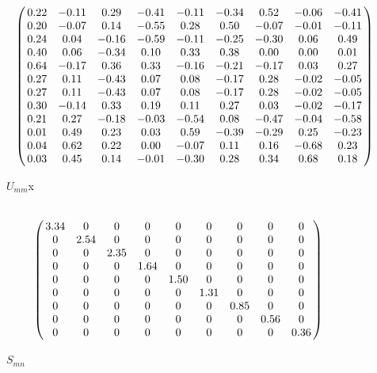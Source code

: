 \begin{figure}[h!]
	\begin{equation} \nonumber
	\bordermatrix{ ~ \cr
		& 0.22 & -0.11 & 0.29 & -0.41 & -0.11 & -0.34 & 0.52 & -0.06 & -0.41 \cr
		& 0.20 & -0.07 & 0.14 & -0.55 & 0.28 & 0.50 & -0.07 & -0.01 & -0.11 \cr
		& 0.24 & 0.04 & -0.16 & -0.59 & -0.11 & -0.25 & -0.30 & 0.06 & 0.49 \cr
		& 0.40 & 0.06 & -0.34 & 0.10 & 0.33 & 0.38 & 0.00 & 0.00 & 0.01 \cr
		& 0.64 & -0.17 & 0.36 & 0.33 & -0.16 & -0.21 & -0.17 & 0.03 & 0.27 \cr
		& 0.27 & 0.11 & -0.43 & 0.07 & 0.08 & -0.17 & 0.28 & -0.02 & -0.05 \cr
		& 0.27 & 0.11 & -0.43 & 0.07 & 0.08 & -0.17 & 0.28 & -0.02 & -0.05 \cr
		& 0.30 & -0.14 & 0.33 & 0.19 & 0.11 & 0.27 & 0.03 & -0.02 & -0.17 \cr
		& 0.21 & 0.27 & -0.18 & -0.03 & -0.54 & 0.08 & -0.47 & -0.04 & -0.58 \cr
		& 0.01 & 0.49 & 0.23 & 0.03 & 0.59 & -0.39 & -0.29 & 0.25 & -0.23 \cr
		& 0.04 & 0.62 & 0.22 & 0.00 & -0.07 & 0.11 & 0.16 & -0.68 & 0.23 \cr
		& 0.03 & 0.45 & 0.14 & -0.01 & -0.30 & 0.28 & 0.34 & 0.68 & 0.18 \cr	  }
	\end{equation}
	\caption{$U_{mm}$x}
	\label{fig:TDM}
\end{figure}

\begin{figure}[h!]
	\begin{equation} \nonumber
	\bordermatrix{~  \cr	
		& 3.34 & 0 & 0 & 0 & 0 & 0 & 0 & 0 & 0 \cr
		& 0 & 2.54 & 0 & 0 & 0 & 0 & 0 & 0 & 0 \cr
		& 0 & 0 & 2.35 & 0 & 0 & 0 & 0 & 0 & 0 \cr
		& 0 & 0 & 0 & 1.64 & 0 & 0 & 0 & 0 & 0 \cr
		& 0 & 0 & 0 & 0 & 1.50 & 0 & 0 & 0 & 0 \cr
		& 0 & 0 & 0 & 0 & 0 & 1.31 & 0 & 0 & 0 \cr
		& 0 & 0 & 0 & 0 & 0 & 0 & 0.85 & 0 & 0 \cr
		& 0 & 0 & 0 & 0 & 0 & 0 & 0 & 0.56 & 0 \cr
		& 0 & 0 & 0 & 0 & 0 & 0 & 0 & 0 & 0.36 \cr
	  }
	\end{equation}
	\caption{ $S_{mn}$}
	\label{fig:TDM}
\end{figure}

